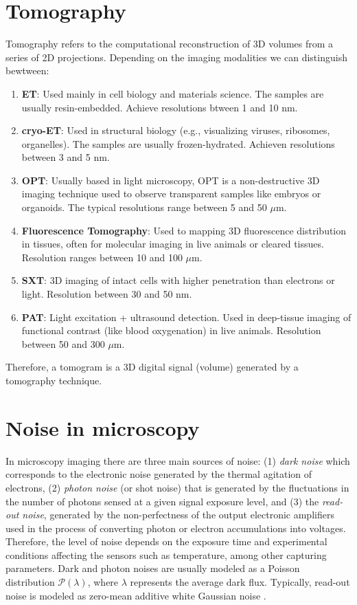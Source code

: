 
\section{Tomography}

Tomography refers to the computational reconstruction of 3D volumes
from a series of 2D projections. Depending on the imaging modalities
we can distinguish bewtween:
\begin{enumerate}
\item \textbf{\gls{ET}}: Used mainly in cell biology and materials
  science. The samples are usually resin-embedded. Achieve resolutions
  btween 1 and 10 nm.
\item \textbf{\gls{cryo-ET}}: Used in structural
  biology (e.g., visualizing viruses, ribosomes, organelles). The
  samples are usually frozen-hydrated. Achieven resolutions between 3
  and 5 nm.
\item \textbf{\gls{OPT}}: Usually based in
  light microscopy, OPT is a non-destructive 3D imaging technique used
  to observe transparent samples like embryos or organoids. The
  typical resolutions range between 5 and 50 $\mu$m.
\item \textbf{Fluorescence Tomography}: Used to mapping 3D
  fluorescence distribution in tissues, often for molecular imaging in
  live animals or cleared tissues. Resolution ranges between 10 and
  100 $\mu$m.
\item \textbf{\gls{SXT}}: 3D imaging of intact cells with
  higher penetration than electrons or light. Resolution between 30
  and 50 nm.
\item \textbf{\gls{PAT}}: Light excitation + ultrasound
  detection. Used in deep-tissue imaging of functional contrast (like
  blood oxygenation) in live animals. Resolution between 50 and 300
  $\mu$m.
\end{enumerate}

Therefore, a tomogram is a 3D digital signal (volume) generated by a
tomography technique.


\section{Noise in microscopy}

In microscopy imaging there are three main sources of noise: (1)
\emph{dark noise} which corresponds to the electronic noise generated
by the thermal agitation of electrons, (2) \emph{photon noise} (or
shot noise) that is generated by the fluctuations in the number of
photons sensed at a given signal exposure level, and (3) the
\emph{read-out noise}, generated by the non-perfectness of the output
electronic amplifiers used in the process of converting photon or
electron accumulations into voltages. Therefore, the level of noise
depends on the exposure time and experimental conditions affecting the
sensors such as temperature, among other capturing parameters. Dark
and photon noises are usually modeled as a Poisson distribution
$\mathcal{P}(\lambda)$, where $\lambda$ represents the average dark
flux. Typically, read-out noise is modeled as zero-mean additive white Gaussian
noise \cite{meiniel2018denoising,zhou2020wirtinger}.

